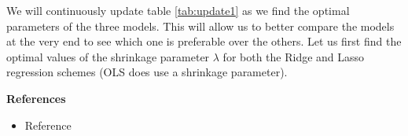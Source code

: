 \documentclass[12pt,a4paper]{article}
\begin{document}
\noindent We will continuously update table \ref{tab:update1} as we find the optimal parameters of the three models. This will allow us to better compare the models at the very end to see which one is preferable over the others. Let us first find the optimal values of the shrinkage parameter $\lambda$ for both the Ridge and Lasso regression schemes (OLS does use a shrinkage parameter). 

\newpage

\begin{center}
\Large{\textbf{References}}
\end{center}

\begin{itemize}
  \item Reference
\end{itemize}
\end{document}
